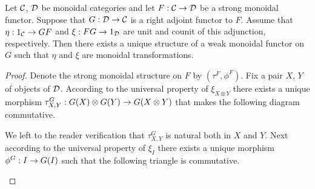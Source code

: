 \begin{theorem}\label{theorem:monoidaladjoint}
Let ${\mathcal C}$, ${\mathcal D}$ be monoidal categories and let $F:{\mathcal C}\rightarrow {\mathcal D}$ be a strong monoidal functor. Suppose that $G:{\mathcal D}\rightarrow {\mathcal C}$ is a right adjoint functor to $F$. Assume that $\eta:1_{{\mathcal C}}\rightarrow GF$ and $\xi:FG\rightarrow 1_{{\mathcal D}}$ are unit and counit of this adjunction, respectively. Then there exists a unique structure of a weak monoidal functor on $G$ such that $\eta$ and $\xi$ are monoidal transformations.
\end{theorem}
\begin{proof}
Denote the strong monoidal structure on $F$ by $(\tau^F,\phi^F)$. Fix a pair $X$, $Y$ of objects of ${\mathcal D}$. According to the universal property of $\xi_{X\otimes Y}$ there exists a unique morphism $\tau^G_{X,Y}:G(X)\otimes G(Y)\rightarrow G(X\otimes Y)$ that makes the following diagram commutative.
\begin{center}
\end{center}
We left to the reader verification that $\tau^G_{X,Y}$ is natural both in $X$ and $Y$. Next according to the universal property of $\xi_I$ there exists a unique morphism $\phi^G:I\rightarrow G(I)$ such that the following triangle is commutative.  
\begin{center}
\end{center}
\end{proof}
